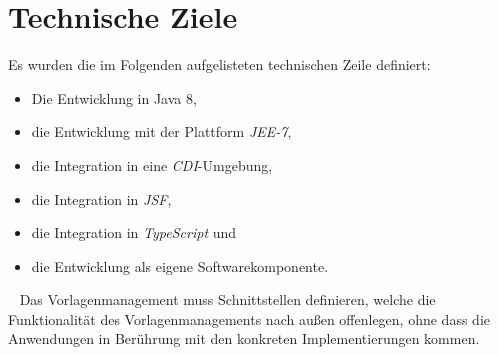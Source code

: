 \section{Technische Ziele}
\label{sec:technical-goals}
Es wurden die im Folgenden aufgelisteten technischen Zeile definiert:
\begin{itemize}
	\item Die Entwicklung in Java 8,
	\item die Entwicklung mit der Plattform \emph{JEE-7},
	\item die Integration in eine \emph{CDI}-Umgebung,
	\item die Integration in \emph{JSF},
	\item die Integration in \emph{TypeScript} und
	\item die Entwicklung als eigene Softwarekomponente.
\end{itemize}
\ \newline
Das Vorlagenmanagement muss Schnittstellen definieren, welche die Funktionalität des Vorlagenmanagements nach außen offenlegen, ohne dass die Anwendungen in Berührung mit den konkreten Implementierungen kommen.